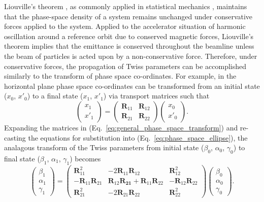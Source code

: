 \documentclass[../main.tex]{subfiles}
\begin{document}
Liouville's theorem \cite{liouville1838note}, as commonly applied in statistical mechanics \cite{gibbs1902elementary}, maintains that the phase-space density of a system remains unchanged under conservative forces applied to the system. Applied to the accelerator situation of harmonic oscillation around a reference orbit due to conserved magnetic forces, Liouville's theorem implies that the emittance is conserved throughout the beamline unless the beam of particles is acted upon by a non-conservative force. Therefore, under conservative forces, the propagation of Twiss parameters can be accomplished similarly to the transform of phase space co-ordinates. For example, in the horizontal plane phase space co-ordinates can be transformed from an initial state ($x_{0}$, $x'_{0}$) to a final state ($x_{1}$, $x'_{1}$) via transport matrices such that
\begin{equation}
\begin{pmatrix}
x_{1} \\
x'_{1}
\end{pmatrix}
=
\begin{pmatrix}
\boldsymbol{R}_{11} & \boldsymbol{R}_{12} \\
\boldsymbol{R}_{21} & \boldsymbol{R}_{22}
\end{pmatrix}
\begin{pmatrix}
x_{0} \\
x'_{0}
\end{pmatrix}.
\label{eq:general_phase_space_transform}
\end{equation}
Expanding the matrices in (Eq.~\ref{eq:general_phase_space_transform}) and re-casting the equations for substitution into (Eq.~\ref{eq:phase_space_ellipse}), the analagous transform of the Twiss parameters from initial state ($\beta_{0}$, $\alpha_{0}$, $\gamma_{0}$) to final state ($\beta_{1}$, $\alpha_{1}$, $\gamma_{1}$) becomes 
\begin{equation}
\begin{pmatrix}
\beta_{1} \\
\alpha_{1} \\
\gamma_{1} 
\end{pmatrix}
=
\begin{pmatrix}
\boldsymbol{R}_{11}^{2} & -2\boldsymbol{R}_{11}\boldsymbol{R}_{12} & \boldsymbol{R}_{12}^{2} \\
-\boldsymbol{R}_{11}\boldsymbol{R}_{21} & \boldsymbol{R}_{12}\boldsymbol{R_{21}}+\boldsymbol{R}_{11}\boldsymbol{R}_{22} & -\boldsymbol{R}_{12}\boldsymbol{R}_{22} \\
\boldsymbol{R}_{21}^{2} & -2\boldsymbol{R}_{21}\boldsymbol{R}_{22} & \boldsymbol{R}_{22}^{2} 
\end{pmatrix}
\begin{pmatrix}
\beta_{0} \\
\alpha_{0} \\
\gamma_{0}
\end{pmatrix}.
\label{eq:general_Twiss_transform}
\end{equation}
\end{document}

